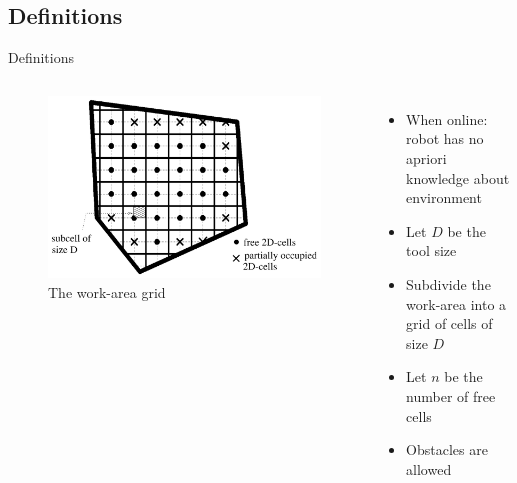 \documentclass{beamer}
\begin{document}
\subsection{Definitions}
\begin{frame}{Definitions}
    \begin{columns}
        \begin{figure}
            \includegraphics[width=\linewidth]{Images/inv_fig1.png}
            \caption{The work-area grid}
        \end{figure}
        \begin{itemize}
            \item When online: robot has no apriori knowledge about environment
            \item Let $D$ be the tool size
            \item Subdivide the work-area into a grid of cells of size $D$
            \item Let $n$ be the number of free cells
            \item Obstacles are allowed
        \end{itemize}
    \end{columns}
\end{frame}
\end{document}
